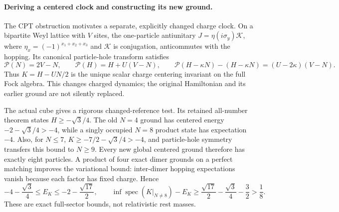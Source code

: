 \paragraph{Deriving a centered clock and constructing its new ground.}
The CPT obstruction motivates a separate, explicitly changed charge
clock. On a bipartite Weyl lattice with $V$ sites, the one-particle
antiunitary $J=\eta(i\sigma_y)\mathcal K$, where
$\eta_x=(-1)^{x_1+x_2+x_3}$ and $\mathcal K$ is conjugation, anticommutes
with the hopping. Its canonical particle-hole transform satisfies
\[
 \mathcal P(N)=2V-N,\qquad
 \mathcal P(H)=H+U(V-N),\qquad
 \mathcal P(H-\kappa N)-(H-\kappa N)=(U-2\kappa)(V-N).
\]
Thus $K=H-UN/2$ is the unique scalar charge centering invariant on the
full Fock algebra. This changes charged dynamics; the original Hamiltonian
and its earlier ground are not silently replaced.

The actual cube gives a rigorous changed-reference test. Its retained
all-number theorem states $H\ge-\sqrt3/4$. The old $N=4$ ground has
centered energy $-2-\sqrt3/4>-4$, while a singly occupied $N=8$ product
state has expectation $-4$. Also, for $N\le7$,
$K\ge-7/2-\sqrt3/4>-4$, and particle-hole symmetry transfers this
bound to $N\ge9$. Every new global centered ground therefore has
exactly eight particles. A product of four exact dimer grounds on a
perfect matching improves the variational bound: inter-dimer hopping
expectations vanish because each factor has fixed charge. Hence
\[
 -4-\frac{\sqrt3}{4}\le E_K\le-2-\frac{\sqrt{17}}2,
 \qquad
 \inf\operatorname{spec}(K|_{N\ne8})-E_K
 \ge\frac{\sqrt{17}}2-\frac{\sqrt3}4-\frac32>\frac18.
\]
These are exact full-sector bounds, not relativistic rest masses.

